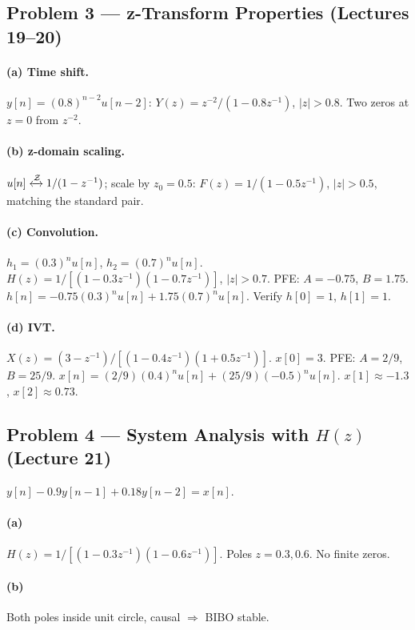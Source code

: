 \documentclass[11pt]{article}
\newcommand{\ZT}{\xleftrightarrow{\mathcal{Z}}}
\begin{document}
\subsection{Problem 3 --- z-Transform Properties (Lectures 19--20)}

\paragraph{(a) Time shift.} $y[n] = (0.8)^{n-2}u[n-2]$: $Y(z) = z^{-2}/(1-0.8 z^{-1})$, $|z|>0.8$. Two zeros at $z=0$ from $z^{-2}$.

\paragraph{(b) z-domain scaling.} $u[n]\ZT 1/(1-z^{-1})$; scale by $z_0=0.5$: $F(z) = 1/(1-0.5 z^{-1})$, $|z|>0.5$, matching the standard pair.

\paragraph{(c) Convolution.} $h_1=(0.3)^n u[n]$, $h_2=(0.7)^n u[n]$. $H(z) = 1/[(1-0.3z^{-1})(1-0.7z^{-1})]$, $|z|>0.7$. PFE: $A=-0.75$, $B=1.75$. $h[n] = -0.75(0.3)^n u[n] + 1.75(0.7)^n u[n]$. Verify $h[0]=1$, $h[1]=1$.

\paragraph{(d) IVT.} $X(z) = (3-z^{-1})/[(1-0.4z^{-1})(1+0.5z^{-1})]$. $x[0] = 3$. PFE: $A=2/9$, $B=25/9$. $x[n]=(2/9)(0.4)^n u[n]+(25/9)(-0.5)^n u[n]$. $x[1]\approx -1.3$, $x[2]\approx 0.73$.

\subsection{Problem 4 --- System Analysis with $H(z)$ (Lecture 21)}
$y[n] - 0.9 y[n-1] + 0.18 y[n-2] = x[n]$.

\paragraph{(a)} $H(z) = 1/[(1-0.3z^{-1})(1-0.6z^{-1})]$. Poles $z=0.3, 0.6$. No finite zeros.

\paragraph{(b)} Both poles inside unit circle, causal $\Rightarrow$ BIBO stable.
\end{document}
